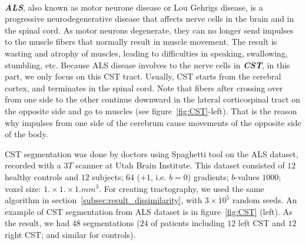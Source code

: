 \\\textbf{\textit{ALS}}, also known as motor neurone disease or Lou Gehrigs disease, is a progressive neurodegenerative disease that affects nerve cells in the brain and in the spinal cord. 
As motor neurons degenerate, they can no longer send impulses to the muscle fibers that normally result in muscle movement. The result is wasting and atrophy of muscles, leading to difficulties in speaking, swallowing, stumbling, etc. %
Because ALS disease involves to the nerve cells in \textit{\textbf{CST}}, in this part, we only focus on this CST tract.
Usually, CST starts from the cerebral cortex, and terminates in the spinal cord. Note that fibers after crossing over from one side to the other
continue downward in the lateral corticospinal tract on the opposite side and go to muscles (see figure~\ref{fig:CST}-left). %
That is the reason why impulses from one side of the cerebrum cause movements of the opposite side of the body.

CST segmentation was done by doctors using Spaghetti tool on the ALS dataset, recorded with a $3T$ scanner at Utah Brain Institute. This dataset consisted of $12$ healthy controls and $12$ subjects; $64$ ($+1$, i.e. $b=0$) gradients; $b$-values $1000$; voxel size: $1. \times 1. \times 1. mm^3$. For creating tractography, we used the same algorithm in section~\ref{subsec:result_dissimilarity}, with $3\times 10^5$ random seeds. An example of CST segmentation from ALS dataset is in figure~\ref{fig:CST} (left). As the result, we had $48$ segmentations ($24$ of patients including $12$ left CST and $12$ right CST; and similar for controls).

